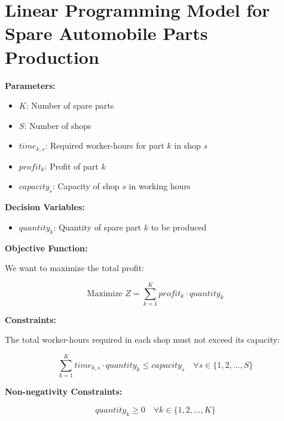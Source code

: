 \documentclass{article}
\begin{document}
\section*{Linear Programming Model for Spare Automobile Parts Production}

\textbf{Parameters:}

\begin{itemize}
    \item $K$: Number of spare parts
    \item $S$: Number of shops
    \item $time_{k,s}$: Required worker-hours for part $k$ in shop $s$
    \item $profit_{k}$: Profit of part $k$
    \item $capacity_{s}$: Capacity of shop $s$ in working hours
\end{itemize}

\textbf{Decision Variables:}

\begin{itemize}
    \item $quantity_{k}$: Quantity of spare part $k$ to be produced
\end{itemize}

\textbf{Objective Function:}

We want to maximize the total profit:

\[
\text{Maximize } Z = \sum_{k=1}^{K} profit_k \cdot quantity_k
\]

\textbf{Constraints:}

The total worker-hours required in each shop must not exceed its capacity:

\[
\sum_{k=1}^{K} time_{k,s} \cdot quantity_k \leq capacity_s \quad \forall s \in \{1, 2, \ldots, S\}
\]

\textbf{Non-negativity Constraints:}

\[
quantity_k \geq 0 \quad \forall k \in \{1, 2, \ldots, K\}
\]
\end{document}

